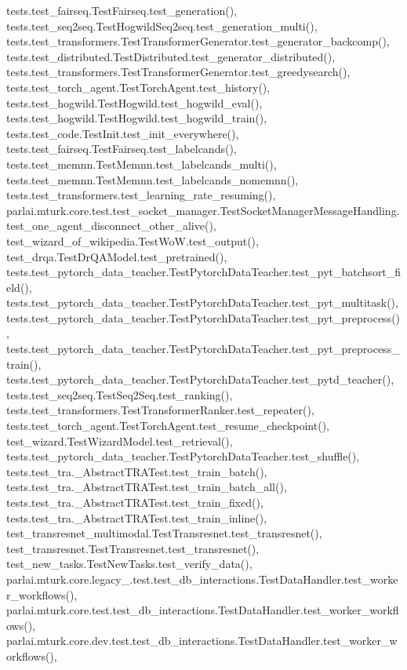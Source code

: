 tests.\+test\+\_\+fairseq.\+Test\+Fairseq.\+test\+\_\+generation(), tests.\+test\+\_\+seq2seq.\+Test\+Hogwild\+Seq2seq.\+test\+\_\+generation\+\_\+multi(), tests.\+test\+\_\+transformers.\+Test\+Transformer\+Generator.\+test\+\_\+generator\+\_\+backcomp(), tests.\+test\+\_\+distributed.\+Test\+Distributed.\+test\+\_\+generator\+\_\+distributed(), tests.\+test\+\_\+transformers.\+Test\+Transformer\+Generator.\+test\+\_\+greedysearch(), tests.\+test\+\_\+torch\+\_\+agent.\+Test\+Torch\+Agent.\+test\+\_\+history(), tests.\+test\+\_\+hogwild.\+Test\+Hogwild.\+test\+\_\+hogwild\+\_\+eval(), tests.\+test\+\_\+hogwild.\+Test\+Hogwild.\+test\+\_\+hogwild\+\_\+train(), tests.\+test\+\_\+code.\+Test\+Init.\+test\+\_\+init\+\_\+everywhere(), tests.\+test\+\_\+fairseq.\+Test\+Fairseq.\+test\+\_\+labelcands(), tests.\+test\+\_\+memnn.\+Test\+Memnn.\+test\+\_\+labelcands\+\_\+multi(), tests.\+test\+\_\+memnn.\+Test\+Memnn.\+test\+\_\+labelcands\+\_\+nomemnn(), tests.\+test\+\_\+transformers.\+test\+\_\+learning\+\_\+rate\+\_\+resuming(), parlai.\+mturk.\+core.\+test.\+test\+\_\+socket\+\_\+manager.\+Test\+Socket\+Manager\+Message\+Handling.\+test\+\_\+one\+\_\+agent\+\_\+disconnect\+\_\+other\+\_\+alive(), test\+\_\+wizard\+\_\+of\+\_\+wikipedia.\+Test\+Wo\+W.\+test\+\_\+output(), test\+\_\+drqa.\+Test\+Dr\+Q\+A\+Model.\+test\+\_\+pretrained(), tests.\+test\+\_\+pytorch\+\_\+data\+\_\+teacher.\+Test\+Pytorch\+Data\+Teacher.\+test\+\_\+pyt\+\_\+batchsort\+\_\+field(), tests.\+test\+\_\+pytorch\+\_\+data\+\_\+teacher.\+Test\+Pytorch\+Data\+Teacher.\+test\+\_\+pyt\+\_\+multitask(), tests.\+test\+\_\+pytorch\+\_\+data\+\_\+teacher.\+Test\+Pytorch\+Data\+Teacher.\+test\+\_\+pyt\+\_\+preprocess(), tests.\+test\+\_\+pytorch\+\_\+data\+\_\+teacher.\+Test\+Pytorch\+Data\+Teacher.\+test\+\_\+pyt\+\_\+preprocess\+\_\+train(), tests.\+test\+\_\+pytorch\+\_\+data\+\_\+teacher.\+Test\+Pytorch\+Data\+Teacher.\+test\+\_\+pytd\+\_\+teacher(), tests.\+test\+\_\+seq2seq.\+Test\+Seq2\+Seq.\+test\+\_\+ranking(), tests.\+test\+\_\+transformers.\+Test\+Transformer\+Ranker.\+test\+\_\+repeater(), tests.\+test\+\_\+torch\+\_\+agent.\+Test\+Torch\+Agent.\+test\+\_\+resume\+\_\+checkpoint(), test\+\_\+wizard.\+Test\+Wizard\+Model.\+test\+\_\+retrieval(), tests.\+test\+\_\+pytorch\+\_\+data\+\_\+teacher.\+Test\+Pytorch\+Data\+Teacher.\+test\+\_\+shuffle(), tests.\+test\+\_\+tra.\+\_\+\+Abstract\+T\+R\+A\+Test.\+test\+\_\+train\+\_\+batch(), tests.\+test\+\_\+tra.\+\_\+\+Abstract\+T\+R\+A\+Test.\+test\+\_\+train\+\_\+batch\+\_\+all(), tests.\+test\+\_\+tra.\+\_\+\+Abstract\+T\+R\+A\+Test.\+test\+\_\+train\+\_\+fixed(), tests.\+test\+\_\+tra.\+\_\+\+Abstract\+T\+R\+A\+Test.\+test\+\_\+train\+\_\+inline(), test\+\_\+transresnet\+\_\+multimodal.\+Test\+Transresnet.\+test\+\_\+transresnet(), test\+\_\+transresnet.\+Test\+Transresnet.\+test\+\_\+transresnet(), test\+\_\+new\+\_\+tasks.\+Test\+New\+Tasks.\+test\+\_\+verify\+\_\+data(), parlai.\+mturk.\+core.\+legacy\+\_.\+test.\+test\+\_\+db\+\_\+interactions.\+Test\+Data\+Handler.\+test\+\_\+worker\+\_\+workflows(), parlai.\+mturk.\+core.\+test.\+test\+\_\+db\+\_\+interactions.\+Test\+Data\+Handler.\+test\+\_\+worker\+\_\+workflows(), parlai.\+mturk.\+core.\+dev.\+test.\+test\+\_\+db\+\_\+interactions.\+Test\+Data\+Handler.\+test\+\_\+worker\+\_\+workflows(), 
